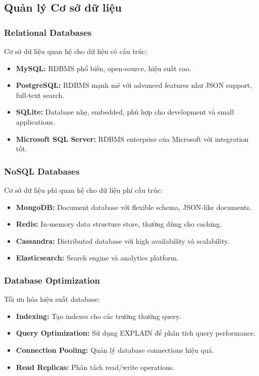 \documentclass[a4paper,12pt]{report}
\begin{document}
\subsection{Quản lý Cơ sở dữ liệu}

\subsubsection{Relational Databases}
Cơ sở dữ liệu quan hệ cho dữ liệu có cấu trúc:
\begin{itemize}
    \item \textbf{MySQL:} RDBMS phổ biến, open-source, hiệu suất cao.
    \item \textbf{PostgreSQL:} RDBMS mạnh mẽ với advanced features như JSON support, full-text search.
    \item \textbf{SQLite:} Database nhẹ, embedded, phù hợp cho development và small applications.
    \item \textbf{Microsoft SQL Server:} RDBMS enterprise của Microsoft với integration tốt.
\end{itemize}

\subsubsection{NoSQL Databases}
Cơ sở dữ liệu phi quan hệ cho dữ liệu phi cấu trúc:
\begin{itemize}
    \item \textbf{MongoDB:} Document database với flexible schema, JSON-like documents.
    \item \textbf{Redis:} In-memory data structure store, thường dùng cho caching.
    \item \textbf{Cassandra:} Distributed database với high availability và scalability.
    \item \textbf{Elasticsearch:} Search engine và analytics platform.
\end{itemize}

\subsubsection{Database Optimization}
Tối ưu hóa hiệu suất database:
\begin{itemize}
    \item \textbf{Indexing:} Tạo indexes cho các trường thường query.
    \item \textbf{Query Optimization:} Sử dụng EXPLAIN để phân tích query performance.
    \item \textbf{Connection Pooling:} Quản lý database connections hiệu quả.
    \item \textbf{Read Replicas:} Phân tách read/write operations.
\end{itemize}
\end{document}
